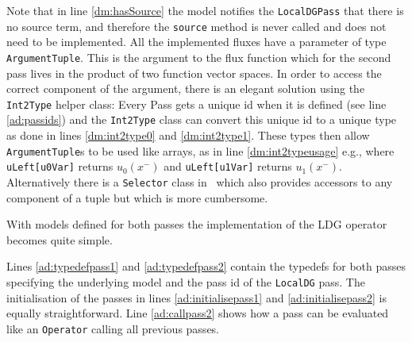 %
\begin{lst}
  \label{lst:advdiffd2}\mbox{}
  
\end{lst}
%
Note that in line \ref{dm:hasSource} the model notifies the
\lstinline!LocalDGPass! that there is no source term, and therefore the
\lstinline!source! method is never called and does not need to be implemented.
All the implemented fluxes have a parameter of type \lstinline!ArgumentTuple!.
This is the argument to the flux function which for the second pass lives in
the product of two function vector spaces. In order to access the correct
component of the argument, there is an elegant solution using the
\lstinline!Int2Type! helper class: Every Pass gets a unique id when it is
defined (see line \ref{ad:passids}) and the \lstinline!Int2Type! class can
convert this unique id to a unique type as done in lines \ref{dm:int2type0} and
\ref{dm:int2type1}. These types then allow \lstinline!ArgumentTuple!s to be
used like arrays, as in line \ref{dm:int2typeusage} e.g., where
\lstinline!uLeft[u0Var]! returns $u_{0}(x^{-})$ and \lstinline!uLeft[u1Var]!
returns $u_{1}(x^{-})$. Alternatively there is a \lstinline!Selector! class in
\Fem\ which also provides accessors to any component of a tuple but which is
more cumbersome.

With models defined for both passes the implementation of the LDG operator
becomes quite simple.
%
\begin{lst} \label{lst:advectdiffhh}\mbox{}
  
\end{lst}
%
Lines \ref{ad:typedefpass1} and \ref{ad:typedefpass2} contain the typedefs for
both passes specifying the underlying model and the pass id of the
\lstinline!LocalDG! pass. The initialisation of the passes in lines
\ref{ad:initialisepass1} and \ref{ad:initialisepass2} is equally
straightforward.  Line \ref{ad:callpass2} shows how a pass can be evaluated
like an \lstinline!Operator! calling all previous passes.
%
%

